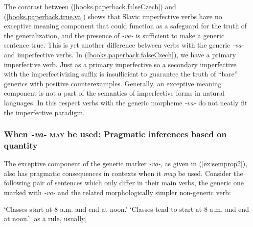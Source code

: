 \documentclass[output=paper,colorlinks,citecolor=brown]{langscibook}
\begin{document}
The contrast between (\ref{books.paperback.falseCzech})
and (\ref{books.paperback.true.va}) shows that Slavic imperfective verbs have no exceptive meaning component that could function as a
safeguard for the truth of the generalization, and the presence of \textit{-va-}
is sufficient to make a generic sentence true.
This is yet another difference between
verbs with the generic \textit{-va-} and imperfective verbs.
In (\ref{books.paperback.falseCzech}), we have a primary imperfective verb.
Just as a primary imperfective so a secondary imperfective with
the imperfectivizing suffix is insufficient to guarantee the truth of
``bare'' generics with positive counterexamples.
Generally, an exceptive meaning component is not a part of the semantics of imperfective forms in natural languages. In this respect
verbs with the generic morpheme \textit{-va-} do not neatly fit the imperfective paradigm.





\subsubsection{When \textit{-va-} \textsc{may} be used: Pragmatic inferences based on quantity} \label{maybeused}

The exceptive component of the generic
marker \textit{-va-}, as given in (\ref{ex:semprop2}),
also has pragmatic consequences in contexts when it \textit{may} be used.
Consider the following pair of sentences which only differ
in their main verbs, the generic one marked with \textit{-va-} and
the related morphologically simpler non-generic verb:

\ea\label{classes.toplevel}
\glt `Classes start at 8 a.m. and end at noon.'
\glt `Classes tend to start at 8 a.m. and end at noon.' [as a rule, usually]
\z
\z
\end{document}

